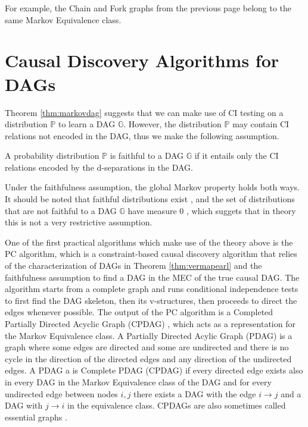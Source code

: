 \documentclass{tufte-book}
\begin{document}
For example, the Chain and Fork graphs from the previous page belong to the same Markov Equivalence class.

\section{Causal Discovery Algorithms for DAGs}
\label{sec:org164102b}

Theorem \ref{thm:markovdag} suggests that we can make use of CI testing on a distribution \(\mathbb{P}\) to learn a DAG \(\mathbb{G}\). However, the distribution \(\mathbb{P}\) may contain CI relations not encoded in the DAG, thus we make the following assumption.

\begin{definition}[Faithfulness]\label{def:faithfulness}

A probability distribution $\mathbb{P}$ is faithful to a DAG $\mathbb{G}$ if it entails only the CI relations encoded by the d-separations in the DAG.

\end{definition}

Under the faithfulness assumption, the global Markov property holds both ways. It should be noted that faithful distributions exist \cite{meek-1995-stron-compl}, and the set of distributions that are not faithful to a DAG \(\mathbb{G}\) have measure \(0\) \cite{uhler-2013-geomet-faith}, which suggets that in theory this is not a very restrictive assumption.



One of the first practical algorithms which make use of the theory above is the PC algorithm, \cite{spirtes-2000-causation-prediction-search,kalisch-2007-estim-high} which is a constraint-based causal discovery algorithm that relies of the characterization of DAGs in Theorem \ref{thm:vermapearl} and the faithfulness assumption to find a DAG in the MEC of the true causal DAG. The algorithm starts from a complete graph and runs conditional independence tests to first find the DAG skeleton, then its v-structures, then proceeds to direct the edges whenever possible. The output of the PC algorithm is a Completed Partially Directed Acyclic Graph (CPDAG) \cite{meek-1995-causal-infer}, which acts as a representation for the Markov Equivalence class. A Partially Directed Acylic Graph (PDAG) is a graph where some edges are directed and some are undirected and there is no cycle in the direction of the directed edges and any direction of the undirected edges. A PDAG a is Complete PDAG (CPDAG) if every directed edge exists also in every DAG in the Markov Equivalence class of the DAG and for every undirected edge between nodes \(i,j\) there exists a DAG with the edge \(i \rightarrow j\) and a DAG with \(j \rightarrow i\) in the equivalence class. CPDAGs are also sometimes called essential graphs \cite{andersson-1997-charac-markov}.
\end{document}
